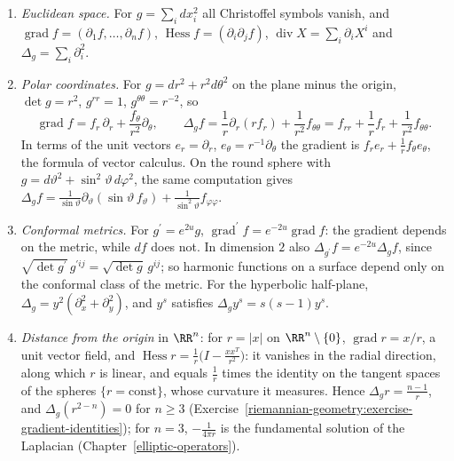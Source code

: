 \begin{example}\label{riemannian-geometry:example-gradient-hessian}
\begin{enumerate}
\item \emph{Euclidean space.} For $g = \sum_idx_i^2$ all Christoffel symbols vanish, and $\operatorname{grad}f = (\partial_1f, \ldots, \partial_nf)$, $\operatorname{Hess}f = (\partial_i\partial_jf)$,
$\operatorname{div}X = \sum_i\partial_iX^i$ and $\Delta_g = \sum_i\partial_i^2$.
\item \emph{Polar coordinates.} For $g = dr^2 + r^2d\theta^2$ on the plane minus the origin, $\det g = r^2$, $g^{rr} = 1$, $g^{\theta\theta} = r^{-2}$, so
\[
\operatorname{grad}f = f_r\,\partial_r + \frac{f_\theta}{r^2}\partial_\theta, \qquad \Delta_gf = \frac1r\partial_r(rf_r) + \frac{1}{r^2}f_{\theta\theta} = f_{rr} + \frac1rf_r + \frac{1}{r^2}f_{\theta\theta} .
\]
In terms of the unit vectors $e_r = \partial_r$, $e_\theta = r^{-1}\partial_\theta$ the gradient is $f_re_r + \frac1rf_\theta e_\theta$, the formula of vector calculus. On the round sphere with
$g = d\vartheta^2 + \sin^2\vartheta\,d\varphi^2$, the same computation gives $\Delta_gf = \frac{1}{\sin\vartheta}\partial_\vartheta(\sin\vartheta\,f_\vartheta) + \frac{1}{\sin^2\vartheta}f_{\varphi\varphi}$.
\item \emph{Conformal metrics.} For $g^{\prime} = e^{2u}g$, $\operatorname{grad}^{\prime}f = e^{-2u}\operatorname{grad}f$: the gradient depends on the metric, while $df$ does not. In dimension $2$ also
$\Delta_{g^{\prime}}f = e^{-2u}\Delta_gf$, since $\sqrt{\det g^{\prime}}\,g^{\prime ij} = \sqrt{\det g}\,g^{ij}$; so harmonic functions on a surface depend only on the conformal class of the metric. For the
hyperbolic half-plane, $\Delta_g = y^2(\partial_x^2 + \partial_y^2)$, and $y^s$ satisfies $\Delta_gy^s = s(s - 1)y^s$.
\item \emph{Distance from the origin} in $\RR^n$: for $r = |x|$ on $\RR^n \setminus \{0\}$, $\operatorname{grad}r = x/r$, a unit vector field, and
$\operatorname{Hess}r = \frac1r\bigl(I - \frac{xx^T}{r^2}\bigr)$: it vanishes in the radial direction, along which $r$ is linear, and equals $\frac1r$ times the identity on the tangent spaces of the spheres
$\{r = \text{const}\}$, whose curvature it measures. Hence $\Delta_gr = \frac{n-1}{r}$, and $\Delta_g(r^{2-n}) = 0$ for $n \geq 3$ (Exercise~\ref{riemannian-geometry:exercise-gradient-identities}); for $n = 3$, $-\frac{1}{4\pi r}$ is the fundamental solution of the Laplacian
(Chapter~\ref{elliptic-operators}).
\end{enumerate}
\end{example}

